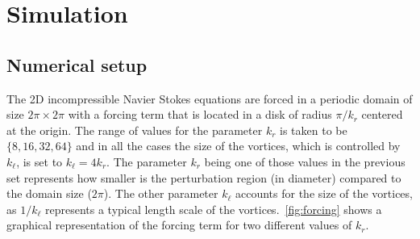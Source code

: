 \documentclass[../main.tex]{subfiles}
\begin{document}
\section{Simulation}\label{sec:results0}
\subsection{Numerical setup}\label{sec:numerical}
The 2D incompressible Navier Stokes equations are forced in a periodic domain of size $2\pi \times 2\pi$ with a forcing term that is located in a disk of radius $\pi/k_r$ centered at the origin.  The range of values for the parameter $k_r$ is taken to be $\{8, 16, 32, 64\}$ and in all the cases the size of the vortices, which is controlled by $k_\ell$, is set to $k_\ell = 4 k_r$. The parameter $k_r$ being one of those values in the previous set represents how smaller is the perturbation region (in diameter) compared to the domain size ($2\pi$). The other parameter $k_\ell$ accounts for the size of the vortices, as $1/k_\ell$ represents a typical length scale of the vortices.~\cref{fig:forcing} shows a graphical representation of the forcing term for two different values of $k_r$.
\end{document}
